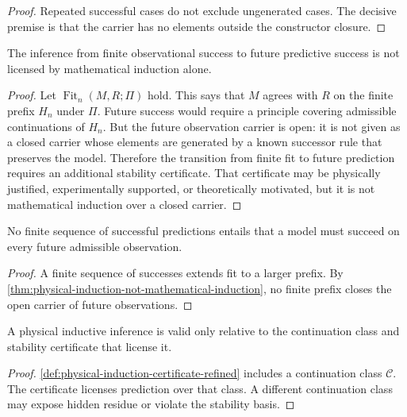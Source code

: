 \begin{proof}
Repeated successful cases do not exclude ungenerated cases. The decisive premise is that the carrier has no elements outside the constructor closure.
\end{proof}

\begin{theorem}
\label{thm:physical-induction-not-mathematical-induction}
The inference from finite observational success to future predictive success is not licensed by mathematical induction alone.
\end{theorem}

\begin{proof}
Let $\operatorname{Fit}_n(M,R;\Pi)$ hold. This says that $M$ agrees with $R$ on the finite prefix $H_n$ under $\Pi$. Future success would require a principle covering admissible continuations of $H_n$. But the future observation carrier is open: it is not given as a closed carrier whose elements are generated by a known successor rule that preserves the model. Therefore the transition from finite fit to future prediction requires an additional stability certificate. That certificate may be physically justified, experimentally supported, or theoretically motivated, but it is not mathematical induction over a closed carrier.
\end{proof}

\begin{corollary}
\label{cor:repeated-success-not-necessity}
No finite sequence of successful predictions entails that a model must succeed on every future admissible observation.
\end{corollary}

\begin{proof}
A finite sequence of successes extends fit to a larger prefix. By \autoref{thm:physical-induction-not-mathematical-induction}, no finite prefix closes the open carrier of future observations.
\end{proof}

\begin{corollary}
\label{cor:physical-induction-certificate-relative}
A physical inductive inference is valid only relative to the continuation class and stability certificate that license it.
\end{corollary}

\begin{proof}
\autoref{def:physical-induction-certificate-refined} includes a continuation class $\mathcal C$. The certificate licenses prediction over that class. A different continuation class may expose hidden residue or violate the stability basis.
\end{proof}

